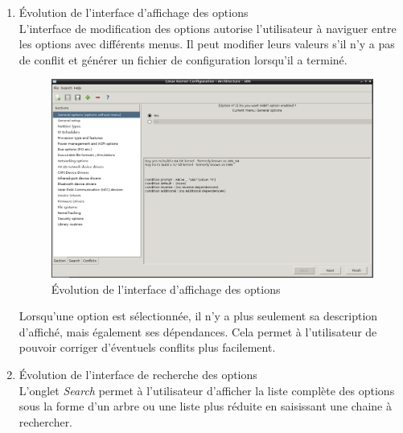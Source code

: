 \documentclass[17pts]{report}
\begin{document}
\begin{enumerate}
    \pagebreak
    \item Évolution de l'interface d'affichage des options \\

    L'interface de modification des options autorise l'utilisateur à naviguer
    entre les options avec différents menus. Il peut modifier leurs valeurs
    s'il n'y a pas de conflit et générer un fichier de configuration lorsqu'il
    a terminé.

    \begin{figure}[H]
        \includegraphics[scale=0.5]{./illustrations/screen_options_interface.png}
        \centering
        \caption{Évolution de l'interface d'affichage des options}
        \label{fig:Evo_affichage_opt}
    \end{figure}

    Lorsqu'une option est sélectionnée, il n'y a plus seulement sa description
    d'affiché, mais également ses dépendances. Cela permet à l'utilisateur de
    pouvoir corriger d'éventuels conflits plus facilement.

    \pagebreak

    \item Évolution de l'interface de recherche des options \\

    L'onglet \textit{Search} permet à l'utilisateur d'afficher la liste
    complète des options sous la forme d'un arbre ou une liste plus réduite en
    saisissant une chaine à rechercher.


\end{enumerate}
\end{document}
